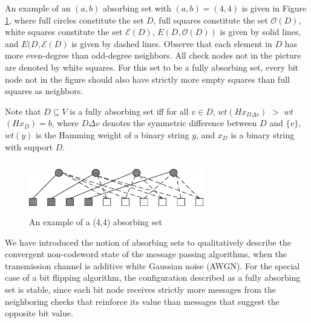 An example of an $(a,b)$ absorbing set with $(a,b) = (4,4)$ is
given in Figure \ref{abs44}, where full circles constitute the set
$D$, full squares constitute the set $\mathcal{O}(D)$, white
squares constitute the set $\mathcal{E}(D)$, $E(D,\mathcal{O}(D))$
is given by solid lines, and $E(D,\mathcal{E}(D)$ is given by
dashed lines. Observe that each element in $D$ has more
even-degree than odd-degree neighbors. All check nodes not in the
picture are denoted by white squares. For this set to be a fully
absorbing set, every bit node not in the figure should also have
strictly more empty squares than full squares as neighbors.




Note that $D \subseteq V$ is a fully absorbing set iff for all $v
\in D$, $wt$$(Hx_{D \Delta v})$ $>$ $wt$$(Hx_D)=b$, where $D
\Delta v$ denotes the symmetric difference between $D$ and
$\{v\}$, $wt(y)$ is the Hamming weight of a binary string $y$, and
$x_D$ is a binary string with support $D$.

\begin{figure}
\center\includegraphics[width=3.0in,height=0.9in]{Drawing11.eps}
\caption{An example of a (4,4) absorbing set} \label{abs44}
\end{figure}





We have introduced the notion of absorbing sets to qualitatively
describe the convergent non-codeword state of the message passing
algorithms, when the transmission channel is additive white
Gaussian noise (AWGN). For the special case of a bit flipping
algorithm, the configuration described as a fully absorbing set is
stable, since each bit node receives strictly more messages from
the neighboring checks that reinforce its value than messages that
suggest the opposite bit value.

